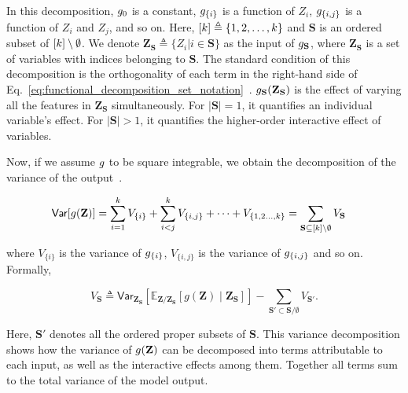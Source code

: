 In this decomposition, $ g_0 $ is a constant, $ g_{\{i\}} $ is a function of $ Z_i $, $ g_{\{i,j\}} $ is a function of $ Z_i $ and $ Z_j $, and so on. Here, $ [k] \triangleq \{1,2,\dots, k\} $ and $ \mathbf{S}$ is an ordered subset of $[k] \setminus \emptyset $.  We denote $ \mathbf{Z}_{\mathbf{S}}  \triangleq \{Z_i | i \in \mathbf{S}\}$ as the input of $ g_{\mathbf{S}} $, where $ \mathbf{Z}_{\mathbf{S}}$ is a set of variables with indices belonging to $ \mathbf{S} $.  The standard condition of this decomposition is the orthogonality of each term in the right-hand side of Eq.~\eqref{eq:functional_decomposition_set_notation}~\cite{sobol1990sensitivity}. $ g_{\mathbf{S}}(\mathbf{Z}_{\mathbf{S}}) $ is the effect of varying all the features in $\mathbf{Z}_{\mathbf{S}}$ simultaneously. %
For $|\mathbf{S}|=1$, it quantifies an individual variable's effect. For $|\mathbf{S}|>1$, it quantifies the higher-order interactive effect of variables.

Now, if we assume $ g $ to be square integrable, we obtain the decomposition of the variance of the output~\cite{sobol1990sensitivity}.

\begin{align}\label{eq:variance_decomposition_set_notation}
	\mathsf{Var}[g(\mathbf{Z})] &= \sum_{i=1}^{k}V_{\{i\}} +  \sum_{i<j}^{k} V_{\{i,j\}}  + \cdots  + V_{\{1, 2\dots, k\}}= \sum_{\mathbf{S} \subseteq [k] \setminus \emptyset} V_{\mathbf{S}} 
\end{align}

where $ V_{\{i\}} $ is the variance of $ g_{\{i\}} $, $ V_{\{i,j\}} $ is the variance of $ g_{\{i,j\}} $ and so on. Formally,  

\[ V_{\mathbf{S}} \triangleq \mathsf{Var} _{\mathbf{Z}_{\mathbf{S}}}\left[\mathbb{E}_{{\textbf {Z}}/\mathbf{Z}_{\mathbf{S}}}[g(\mathbf{Z})\mid \mathbf{Z}_{\mathbf{S}}]\right]- \sum_{\mathbf{S}' \subset \mathbf{S}/\emptyset}{V} _{\mathbf{S}'}.\] 

Here, $\mathbf{S}'$ denotes all the ordered proper subsets of $\mathbf{S}$. %
This variance decomposition shows how the variance of $g(\mathbf{Z}) $ can be decomposed into terms attributable to each input, as well as the interactive effects among them. Together all terms sum to the total variance of the model output. 

